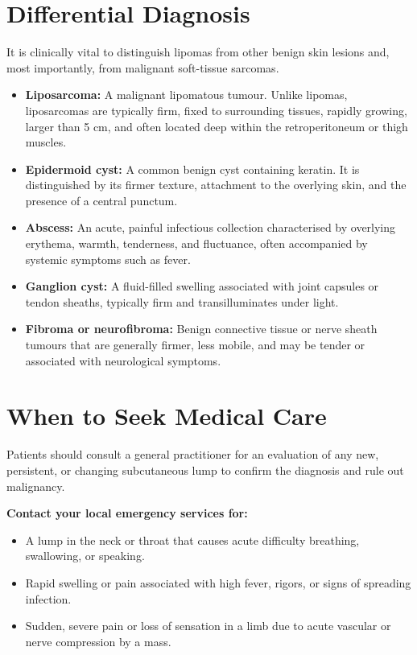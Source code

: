 \section*{Differential Diagnosis}
It is clinically vital to distinguish lipomas from other benign skin lesions and, most importantly, from malignant soft-tissue sarcomas.

\begin{itemize}
    \item \textbf{Liposarcoma:} A malignant lipomatous tumour. Unlike lipomas, liposarcomas are typically firm, fixed to surrounding tissues, rapidly growing, larger than 5 cm, and often located deep within the retroperitoneum or thigh muscles.
    \item \textbf{Epidermoid cyst:} A common benign cyst containing keratin. It is distinguished by its firmer texture, attachment to the overlying skin, and the presence of a central punctum.
    \item \textbf{Abscess:} An acute, painful infectious collection characterised by overlying erythema, warmth, tenderness, and fluctuance, often accompanied by systemic symptoms such as fever.
    \item \textbf{Ganglion cyst:} A fluid-filled swelling associated with joint capsules or tendon sheaths, typically firm and transilluminates under light.
    \item \textbf{Fibroma or neurofibroma:} Benign connective tissue or nerve sheath tumours that are generally firmer, less mobile, and may be tender or associated with neurological symptoms.
\end{itemize}

\section*{When to Seek Medical Care}
Patients should consult a general practitioner for an evaluation of any new, persistent, or changing subcutaneous lump to confirm the diagnosis and rule out malignancy.

\textbf{Contact your local emergency services for:}
\begin{itemize}
    \item A lump in the neck or throat that causes acute difficulty breathing, swallowing, or speaking.
    \item Rapid swelling or pain associated with high fever, rigors, or signs of spreading infection.
    \item Sudden, severe pain or loss of sensation in a limb due to acute vascular or nerve compression by a mass.
\end{itemize}

